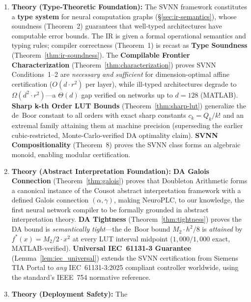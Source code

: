 \documentclass[journal,onecolumn]{IEEEtran}
\begin{document}
\begin{enumerate}
    \item \textbf{Theory (Type-Theoretic Foundation):} The SVNN framework
         constitutes a \textbf{type system} for neural computation graphs
          ({\S}\ref{sec:ir-semantics}), whose soundness (Theorem~2) guarantees
         that well-typed architectures have computable error bounds. The IR
         is given a formal operational semantics and typing rules; compiler
         correctness (Theorem~1) is recast as \textbf{Type Soundness}
          (Theorem~\ref{thm:ir-soundness}). The \textbf{Compilable Frontier Characterization}
          (Theorem~\ref{thm:characterization}) proves SVNN Conditions~1--2 are \textit{necessary and
         sufficient} for dimension-optimal affine certification ($O(d \cdot
         r^2)$ per layer), while ill-typed architectures degrade to
          $\Omega(d^2 \cdot r^2)$---a $\Theta(d)$ gap verified on networks
         up to $d=128$ (MATLAB). \textbf{Sharp k-th Order LUT Bounds}
          (Theorem~\ref{thm:sharp-lut}) generalize the de~Boor constant to
         all orders with exact sharp constants $c_k = Q_k/k!$ and an
         extremal family attaining them at machine precision (superseding
         the earlier cubic-restricted, Monte-Carlo-verified DA optimality
         claim). \textbf{SVNN Compositionality}
          (Theorem~8) proves the SVNN class forms an algebraic monoid,
         enabling modular certification.
    \item \textbf{Theory (Abstract Interpretation Foundation):}
          \textbf{DA Galois Connection} (Theorem~\ref{thm:galois}) proves that
         Doubleton Arithmetic forms a canonical instance of the Cousot abstract
         interpretation framework with a defined Galois connection
          $(\alpha, \gamma)$, making NeuroPLC, to our knowledge, the first neural network
         compiler to be formally grounded in abstract interpretation
         theory. \textbf{DA Tightness} (Theorem~\ref{thm:tightness}) proves the DA bound
         is \textit{semantically tight}---the de~Boor bound $M_2 \cdot
         h^2 / 8$ is \textit{attained} by $f^*(x) = M_2/2 \cdot x^2$
         at every LUT interval midpoint ($1{,}000/1{,}000$ exact,
         MATLAB-verified). \textbf{Universal IEC~61131-3 Guarantee}
          (Lemma~\ref{lem:iec_universal}) extends the SVNN certification
         from Siemens TIA Portal to \textit{any} IEC~61131-3:2025
         compliant controller worldwide, using the standard's IEEE~754
         normative reference.
    \item \textbf{Theory (Deployment Safety):} The

\end{enumerate}
\end{document}
